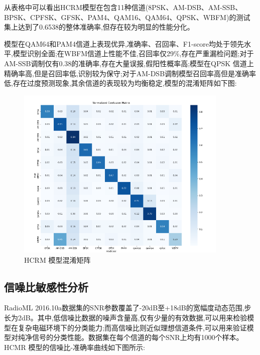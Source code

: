 \documentclass{article}
\begin{document}
\begin{CJK}{UTF8}{gbsn}
从表格中可以看出HCRM模型在包含11种信道(8PSK、AM-DSB、AM-SSB、BPSK、CPFSK、GFSK、PAM4、QAM16、QAM64、QPSK、WBFM)的测试集上达到了0.6538的整体准确率,但存在较为明显的性能分化。

模型在QAM64和PAM4信道上表现优异,准确率、召回率、F1-score均处于领先水平,模型识别全面;在WBFM信道上性能不佳,召回率仅29\%,存在严重漏检问题;对于AM-SSB调制仅有0.38的准确率,存在大量误报,假阳性概率高;模型在QPSK 信道上精确率高,但是召回率低,识别较为保守;对于AM-DSB调制模型召回率高但是准确率低,存在过度预测现象,其余信道的表现较为均衡稳定,模型的混淆矩阵如下图:

\begin{figure}[H]
    \centering
    \includegraphics[width=0.9\textwidth]{figure/image12.png}
    \caption{HCRM 模型混淆矩阵}
    \label{fig:confusion_matrix}
\end{figure}

\subsection{信噪比敏感性分析}
RadioML 2016.10a数据集的SNR参数覆盖了-20dB至+18dB的宽幅度动态范围,步长为2dB。其中,低信噪比数据的噪声含量高,仅有少量的有效数据,可以用来检验模型在复杂电磁环境下的分类能力;而高信噪比则近似理想信道条件,可以用来验证模型对纯净信号的分类性能。数据集在每个信道的每个SNR上均有1000个样本。HCMR 模型的信噪比-准确率曲线如下图所示:


\end{CJK}
\end{document}
